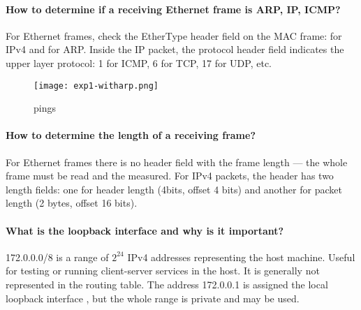 \documentclass[compilation.tex]{subfiles}
\begin{document}
	\paragraph{How to determine if a receiving Ethernet frame is ARP, IP, ICMP?} 
	For Ethernet frames, check the EtherType header field on the MAC frame:  for IPv4 and  for ARP. Inside the IP packet, the protocol header field indicates the upper layer protocol: 1 for ICMP, 6 for TCP, 17 for UDP, etc.
	
	\begin{figure}[htb]
		\centering
		\texttt{[image: exp1-witharp.png]}
		\caption{ pings }
		\label{fig:exp1-witharp}
	\end{figure}
	
	\paragraph{How to determine the length of a receiving frame?}
	For Ethernet frames there is no header field with the frame length --- the whole frame must be read and the measured.
	For IPv4 packets, the header has two length fields: one for header length (4bits, offset 4 bits) and another for packet length (2 bytes, offset 16 bits).
	
	\paragraph{What is the loopback interface and why is it important?}
	172.0.0.0/8 is a range of $2^{24}$ IPv4 addresses representing the host machine.
	Useful for testing or running client-server services in the host. It is generally not represented in the routing table. The address 172.0.0.1 is assigned the local loopback interface , but the whole range is private and may be used.
	
\end{document}
